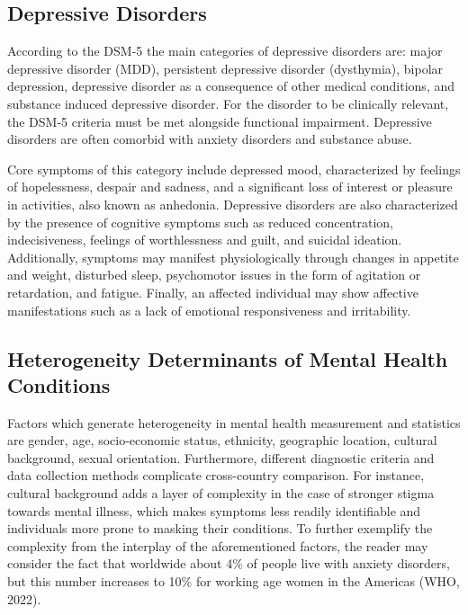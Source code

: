         \subsection{Depressive Disorders}
            According to the DSM-5 the main categories of depressive disorders are: major depressive disorder (MDD), persistent depressive disorder (dysthymia), bipolar depression, depressive disorder as a consequence of other medical conditions, and substance induced depressive disorder. For the disorder to be clinically relevant, the DSM-5 criteria must be met alongside functional impairment.
            Depressive disorders are often comorbid with anxiety disorders and substance abuse. 

            Core symptoms of this category include depressed mood, characterized by feelings of hopelessness, despair and sadness, and a significant loss of interest or pleasure in activities, also known as anhedonia. Depressive disorders are also characterized by the presence of cognitive symptoms such as reduced concentration, indecisiveness, feelings of worthlessness and guilt, and suicidal ideation. Additionally, symptoms may manifest physiologically through changes in appetite and weight, disturbed sleep, psychomotor issues in the form of agitation or retardation, and fatigue. Finally, an affected individual may show affective manifestations such as a lack of emotional responsiveness and irritability. 
        \subsection{Heterogeneity Determinants of Mental Health Conditions}
            Factors which generate heterogeneity in mental  health measurement and statistics are gender, age, socio-economic status, ethnicity, geographic location, cultural background, sexual orientation. Furthermore, different diagnostic criteria and data collection methods complicate cross-country comparison. 
            For instance, cultural background adds a layer of complexity in the case of stronger stigma towards mental illness, which makes symptoms less readily identifiable and individuals more prone to masking their conditions.  
            To further exemplify the complexity from the interplay of the aforementioned factors, the reader may consider the fact that worldwide about 4\% of people live with anxiety disorders, but this number increases to 10\% for working age women in the Americas (WHO, 2022). 
        
